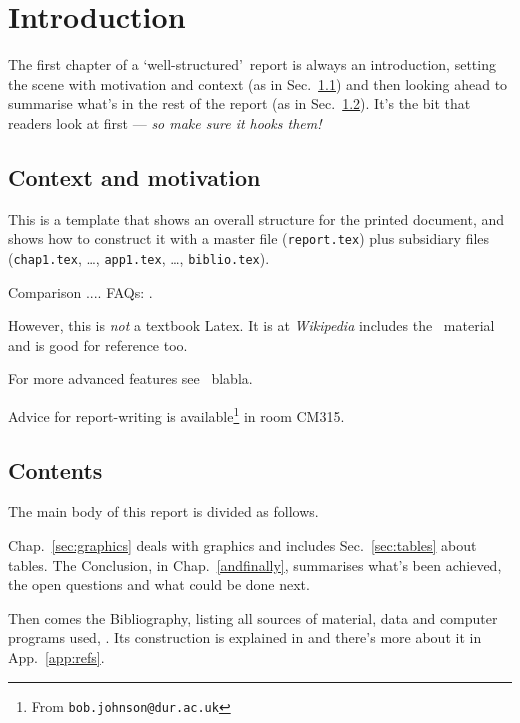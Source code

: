 \chapter{Introduction}
The first chapter of a \lq well-structured\rq\ report is always an
introduction, setting the scene with motivation and context (as in
Sec.~\ref{intro}) and then looking ahead to summarise what's in the
rest of the report (as in Sec.~\ref{intro:contents}). It's the
bit that readers look at first --- {\em so make sure it hooks them!}
%
\section{Context and motivation}\label{intro}
This is a template that shows an overall structure for the
printed document, and shows how to construct it with a master file
(\texttt{report.tex}) plus subsidiary files (\texttt{chap1.tex},
\dots, \texttt{app1.tex}, \dots, \texttt{biblio.tex}).
\par
Comparison .... FAQs: .
\par
However, this is {\em not} a textbook Latex. It is at \textsl{Wikipedia}
\cite{WL} includes the \nss\ material and is good for reference too.
\par
For more advanced features see \eg\ blabla.
\par
Advice for report-writing is available\footnote{From  \texttt{bob.johnson@dur.ac.uk}}
in room CM315.
%
\section{Contents}\label{intro:contents}
The main body of this report is divided as follows.
\par
Chap.~\ref{sec:graphics} deals with graphics and includes
Sec.~\ref{sec:tables} about tables. The Conclusion, in
Chap.~\ref{andfinally}, summarises what's been achieved, the open
questions and what could be done next.
\par
Then comes the Bibliography, listing all sources of material, data and
computer programs used, \etc. Its construction is explained in
\cite[Sec.~4.2]{NSS} and there's more about it in App.~\ref{app:refs}.
%
